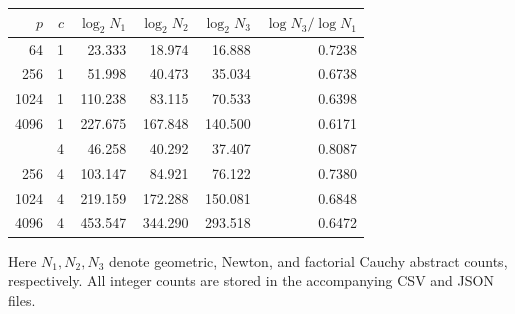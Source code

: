 \begin{center}
\small
\begin{tabular}{@{}rrrrrr@{}}
\toprule
$p$ & $c$ & $\log_2 N_1$ & $\log_2 N_2$ & $\log_2 N_3$ & $\log N_3/\log N_1$\\
\midrule
64 & 1 & 23.333 & 18.974 & 16.888 & 0.7238\\
256 & 1 & 51.998 & 40.473 & 35.034 & 0.6738\\
1024 & 1 & 110.238 & 83.115 & 70.533 & 0.6398\\
4096 & 1 & 227.675 & 167.848 & 140.500 & 0.6171\\
\addlinespace
64 & 4 & 46.258 & 40.292 & 37.407 & 0.8087\\
256 & 4 & 103.147 & 84.921 & 76.122 & 0.7380\\
1024 & 4 & 219.159 & 172.288 & 150.081 & 0.6848\\
4096 & 4 & 453.547 & 344.290 & 293.518 & 0.6472\\
\bottomrule
\end{tabular}
\end{center}
Here $N_1,N_2,N_3$ denote geometric, Newton, and factorial Cauchy abstract counts, respectively. All integer counts are stored in the accompanying CSV and JSON files.
